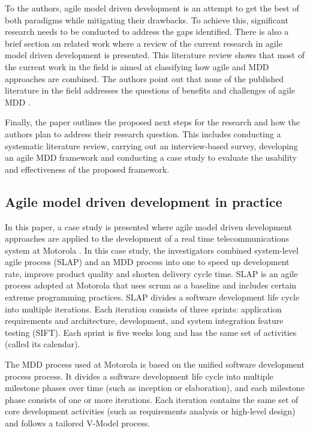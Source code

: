 \documentclass[10pt, a4paper, twocolumn]{article}
\begin{document}
To the authors, agile model driven development is an attempt to get the best of both paradigms while mitigating their drawbacks. To achieve this, significant research needs to be conducted to address the gaps identified. There is also a brief section on related work where a review of the current research in agile model driven development is presented. This literature review shows that most of the current work in the field is aimed at classifying how agile and MDD approaches are combined. The authors point out that none of the published literature in the field addresses the questions of benefits and challenges of agile MDD \cite{matinnejad2011agile,stavru2013challenges,whittle2014state}.

Finally, the paper outlines the proposed next steps for the research and how the authors plan to address their research question. This includes conducting a systematic literature review, carrying out an interview-based survey, developing an agile MDD framework and conducting a case study to evaluate the usability and effectiveness of the proposed framework.

\subsection{Agile model driven development in practice}

In this paper, a case study is presented where agile model driven development approaches are applied to the development of a real time telecommunications system at Motorola \cite{zhang2011agile}. In this case study, the investigators combined system-level agile process (SLAP) and an MDD process into one to speed up development rate, improve product quality and shorten delivery cycle time. SLAP is an agile process adopted at Motorola that uses scrum as a baseline and includes certain extreme programming practices. SLAP divides a software development life cycle into multiple iterations. Each iteration consists of three sprints: application requirements and architecture, development, and system integration feature testing (SIFT). Each sprint is five weeks long and has the same set of activities (called its calendar). 


The MDD process used at Motorola is based on the unified software development process process. It divides a software development life cycle into multiple milestone phases over time (such as inception or elaboration), and each milestone phase consists of one or more iterations. Each iteration contains the same set of core development activities (such as requirements analysis or high-level design) and follows a tailored V-Model process.
\end{document}
